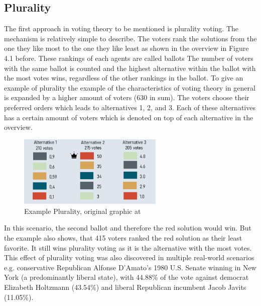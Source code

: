\documentclass[german, a4paper, 11pt, oneside]{scrbook}
\begin{document}
\subsection{Plurality}
The first approach in voting theory to be mentioned is plurality voting. The mechanism is relatively simple to describe. The voters rank the solutions from the one they like most to the one they like least as shown in the overview in Figure 4.1 before. These rankings of each agents are called ballots \cite{FelixBrandtVincentConitzerUlleEndrissJeromeLangandArielD.Procaccia.} The number of voters with the same ballot is counted and the highest alternative within the ballot with the most votes wins, regardless of the other rankings in the ballot. \cite{FelixBrandtVincentConitzerUlleEndrissJeromeLangandArielD.Procaccia.} To give an example of plurality the example of the characteristics of voting theory in general is expanded by a higher amount of voters (630 in sum). The voters choose their preferred orders which leads to alternatives 1, 2, and 3. Each of these alternatives has a certain amount of voters which is denoted on top of each alternative in the overview.
\begin{figure}[h]
\centering
\includegraphics[height=3.4cm]{Plurality}
\caption{Example Plurality, original graphic at \cite{FelixBrandtVincentConitzerUlleEndrissJeromeLangandArielD.Procaccia.}}
\end{figure}
In this scenario, the second ballot and therefore the red solution would win. But the example also shows, that 415 voters ranked the red solution as their least favorite. It still wins plurality voting as it is the alternative with the most votes.
\\
This effect of plurality voting was also discovered in multiple real-world scenarios e.g. conservative Republican Alfonse D’Amato’s 1980 U.S. Senate winning in New York (a predominantly liberal state), with 44.88\% of the vote against democrat Elizabeth Holtzmann (43.54\%) and liberal Republican incumbent Jacob Javits (11.05\%).\cite{FelixBrandtVincentConitzerUlleEndrissJeromeLangandArielD.Procaccia.}
\end{document}
